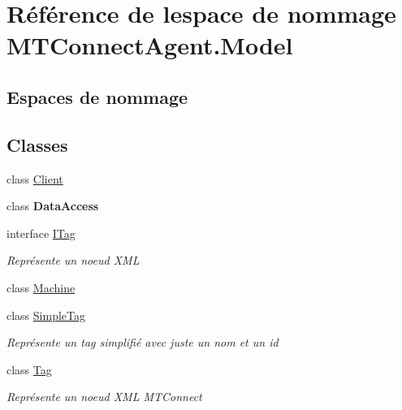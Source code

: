 \hypertarget{namespace_m_t_connect_agent_1_1_model}{}\section{Référence de l\textquotesingle{}espace de nommage M\+T\+Connect\+Agent.\+Model}
\label{namespace_m_t_connect_agent_1_1_model}
\subsection*{Espaces de nommage}
\begin{DoxyCompactItemize}
\end{DoxyCompactItemize}
\subsection*{Classes}
\begin{DoxyCompactItemize}
\item 
class \mbox{\hyperlink{class_m_t_connect_agent_1_1_model_1_1_client}{Client}}
\item 
class {\bfseries Data\+Access}
\item 
interface \mbox{\hyperlink{interface_m_t_connect_agent_1_1_model_1_1_i_tag}{I\+Tag}}
\begin{DoxyCompactList}\small\item\em Représente un noeud X\+ML \end{DoxyCompactList}\item 
class \mbox{\hyperlink{class_m_t_connect_agent_1_1_model_1_1_machine}{Machine}}
\item 
class \mbox{\hyperlink{class_m_t_connect_agent_1_1_model_1_1_simple_tag}{Simple\+Tag}}
\begin{DoxyCompactList}\small\item\em Représente un tag simplifié avec juste un nom et un id \end{DoxyCompactList}\item 
class \mbox{\hyperlink{class_m_t_connect_agent_1_1_model_1_1_tag}{Tag}}
\begin{DoxyCompactList}\small\item\em Représente un noeud X\+ML M\+T\+Connect \end{DoxyCompactList}\end{DoxyCompactItemize}
